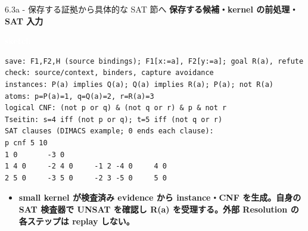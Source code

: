 \documentclass[dvipdfmx,aspectratio=169,11pt]{beamer}
\newcommand{\statusbadge}[2]{\colorbox{#1}{\textcolor{white}{\strut\scriptsize\sffamily\bfseries #2}}}
\newcommand{\badgeSketch}{\statusbadge{orange!75!black}{sketch}}
\begin{document}
\begin{frame}[fragile,t]{6.3a - 保存する証拠から具体的な SAT 節へ}
\smallskip
\textbf{保存する候補・kernel の前処理・SAT 入力}~\badgeSketch
\begin{lstlisting}[language={},basicstyle=\ttfamily\footnotesize]
save: F1,F2,H (source bindings); F1[x:=a], F2[y:=a]; goal R(a), refute
check: source/context, binders, capture avoidance
instances: P(a) implies Q(a); Q(a) implies R(a); P(a); not R(a)
atoms: p=P(a)=1, q=Q(a)=2, r=R(a)=3
logical CNF: (not p or q) & (not q or r) & p & not r
Tseitin: s=4 iff (not p or q); t=5 iff (not q or r)
SAT clauses (DIMACS example; 0 ends each clause):
p cnf 5 10
1 0       -3 0
1 4 0     -2 4 0     -1 2 -4 0     4 0
2 5 0     -3 5 0     -2 3 -5 0     5 0
\end{lstlisting}
\begin{itemize}
\setlength{\itemsep}{1pt}
\setlength{\parsep}{0pt}
\setlength{\parskip}{0pt}
\item \textcolor{blue!55!black}{\textbf{small kernel が検査済み evidence から instance・CNF を生成。自身の SAT 検査器で UNSAT を確認し R(a) を受理する。外部 Resolution の各ステップは replay しない。}}
\end{itemize}
\end{frame}
\end{document}

